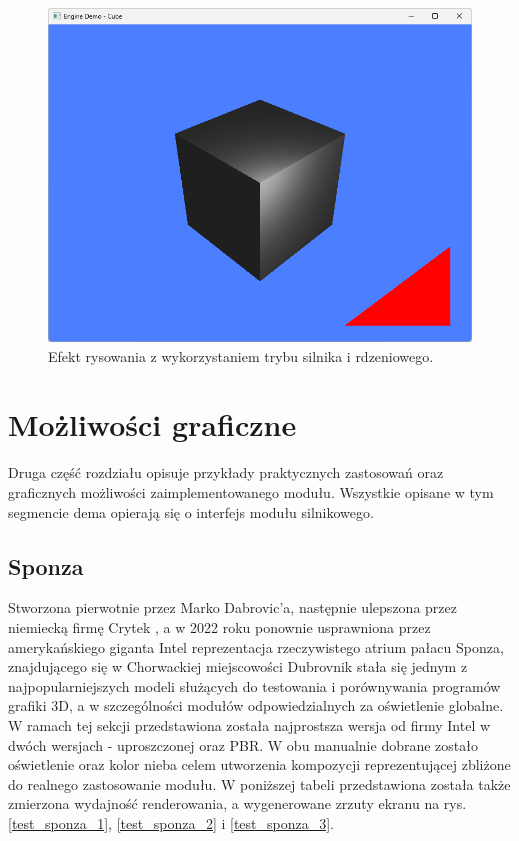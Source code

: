 \vfill
\clearpage

\begin{figure}[h!]
	\centering
	\includegraphics[width=\textwidth]{images/demo_engine_hybrid_drawing.png}
	\caption{Efekt rysowania z wykorzystaniem trybu silnika i rdzeniowego.}
	\label{demo_engine_hybrid_drawing}
\end{figure}

\section{Możliwości graficzne}
Druga część rozdziału opisuje przykłady praktycznych zastosowań oraz graficznych możliwości zaimplementowanego modułu. Wszystkie opisane w tym segmencie dema opierają się o interfejs modułu silnikowego.

\subsection{Sponza}
Stworzona pierwotnie przez Marko Dabrovic'a, następnie ulepszona przez niemiecką firmę Crytek \cite{github:Khronos:Sponza}, a w 2022 roku ponownie usprawniona przez amerykańskiego giganta Intel \cite{Intel:GPUResearch:Sponza} reprezentacja rzeczywistego atrium pałacu Sponza, znajdującego się w Chorwackiej miejscowości Dubrovnik stała się jednym z najpopularniejszych modeli służących do testowania i porównywania programów grafiki 3D, a w szczególności modułów odpowiedzialnych za oświetlenie globalne. W ramach tej sekcji przedstawiona została najprostsza wersja od firmy Intel w dwóch wersjach - uproszczonej oraz PBR. W obu manualnie dobrane zostało oświetlenie oraz kolor nieba celem utworzenia kompozycji reprezentującej zbliżone do realnego zastosowanie modułu. W poniższej tabeli przedstawiona została także zmierzona wydajność renderowania, a wygenerowane zrzuty ekranu na rys. \ref{test_sponza_1}, \ref{test_sponza_2} i \ref{test_sponza_3}.

